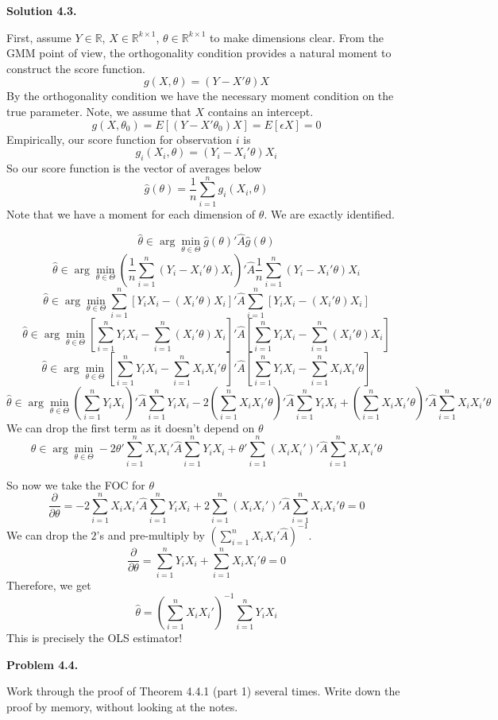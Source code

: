 \documentclass[11pt]{article}
\newenvironment{problem}[1]
    {\bigskip\noindent\textbf{Problem #1.}\par\setlength{\parindent}{0pt}}
    {\medskip}
\newenvironment{solution}[1]
    {\bigskip\noindent\textbf{Solution #1.} \par}
    {\medskip}
\begin{document}
\begin{solution}{4.3}
First, assume $Y \in \mathbb{R}$, $X \in \mathbb{R}^{k \times 1}$, $\theta \in \mathbb{R}^{k \times 1}$ to make dimensions clear. 
From the GMM point of view, the orthogonality condition provides a natural moment to construct the score function.
\[g(X,\theta) = (Y-X'\theta)X\]
By the orthogonality condition we have the necessary moment condition on the true parameter. Note, we assume that $X$ contains an intercept.
\[g(X,\theta_0) = E\left[(Y-X'\theta_0)X\right] = E\left[\epsilon X\right] = 0\]
Empirically, our score function for observation $i$ is
\[g_i(X_i, \theta) = (Y_i - X_i'\theta)X_i\]
So our score function is the vector of averages below
\[\hat{g}(\theta) = \frac{1}{n}\sum_{i=1}^ng_i(X_i, \theta)\]
Note that we have a moment for each dimension of $\theta$. We are exactly identified.

\[\hat{\theta} \in \arg\min_{\theta \in \Theta}\hat{g}(\theta)'\hat{A}\hat{g}(\theta)\]
\[\hat{\theta} \in \arg\min_{\theta \in \Theta} \left(\frac{1}{n}\sum_{i=1}^n(Y_i - X_i'\theta)X_i\right)'\hat{A}\frac{1}{n}\sum_{i=1}^n(Y_i - X_i'\theta)X_i\]
\[\hat{\theta} \in \arg\min_{\theta \in \Theta} \sum_{i=1}^n\left[Y_iX_i - (X_i'\theta) X_i\right]'\hat{A}\sum_{i=1}^n\left[Y_iX_i - (X_i'\theta) X_i\right]\]
\[\hat{\theta} \in \arg\min_{\theta \in \Theta} \left[\sum_{i=1}^nY_iX_i - \sum_{i=1}^n(X_i'\theta) X_i\right]'\hat{A}\left[\sum_{i=1}^nY_iX_i - \sum_{i=1}^n(X_i'\theta) X_i\right]\]
\[\hat{\theta} \in \arg\min_{\theta \in \Theta} \left[\sum_{i=1}^nY_iX_i - \sum_{i=1}^nX_iX_i'\theta \right]'\hat{A}\left[\sum_{i=1}^nY_iX_i - \sum_{i=1}^nX_iX_i'\theta\right]\]
\[\hat{\theta} \in \arg\min_{\theta \in \Theta} (\sum_{i=1}^nY_iX_i)' \hat{A} \sum_{i=1}^n Y_iX_i - 2(\sum_{i=1}^nX_iX_i'\theta)'\hat{A}\sum_{i=1}^nY_iX_i +(\sum_{i=1}^nX_iX_i'\theta)'\hat{A} \sum_{i=1}^nX_iX_i'\theta\]
We can drop the first term as it doesn't depend on $\theta$
\[\hat{\theta} \in \arg\min_{\theta \in \Theta}  - 2\theta'\sum_{i=1}^nX_iX_i'\hat{A}\sum_{i=1}^nY_iX_i +\theta'\sum_{i=1}^n(X_iX_i')'\hat{A} \sum_{i=1}^nX_iX_i'\theta\]

So now we take the FOC for $\theta$
\[\frac{\partial}{\partial \theta} = -2\sum_{i=1}^nX_iX_i'\hat{A}\sum_{i=1}^nY_iX_i + 2\sum_{i=1}^n(X_iX_i')'\hat{A} \sum_{i=1}^nX_iX_i'\theta = 0 \]
We can drop the $2$'s and pre-multiply by $(\sum_{i=1}^nX_iX_i'\hat{A})^{-1}$. 
\[\frac{\partial}{\partial \theta} = \sum_{i=1}^nY_iX_i +  \sum_{i=1}^nX_iX_i'\theta = 0 \]
Therefore, we get 
\[\hat{\theta}  = (\sum_{i=1}^nX_iX_i')^{-1}\sum_{i=1}^nY_iX_i\]
This is precisely the OLS estimator!


\end{solution}
\newpage
\begin{problem}{4.4}
Work through the proof of Theorem 4.4.1 (part 1) several
times. Write down the proof by memory, without looking at
the notes.
\end{problem}
\end{document}
